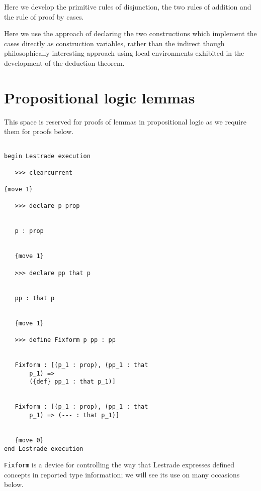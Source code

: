 \documentclass[12pt]{article}
\begin{document}
Here we develop the primitive rules of disjunction, the two rules of addition and the rule of proof by cases.

Here we use the approach of declaring the two constructions which implement the cases directly as construction variables, rather than the indirect though philosophically interesting approach using local environments exhibited in the development of the deduction theorem.

\section{Propositional logic lemmas}

This space is reserved for proofs of lemmas in propositional logic as we require them for proofs below.

\begin{verbatim}

begin Lestrade execution

   >>> clearcurrent

{move 1}

   >>> declare p prop


   p : prop


   {move 1}

   >>> declare pp that p


   pp : that p


   {move 1}

   >>> define Fixform p pp : pp


   Fixform : [(p_1 : prop), (pp_1 : that 
       p_1) => 
       ({def} pp_1 : that p_1)]


   Fixform : [(p_1 : prop), (pp_1 : that 
       p_1) => (--- : that p_1)]


   {move 0}
end Lestrade execution
\end{verbatim}

{\tt Fixform} is a device for controlling the way that Lestrade expresses defined concepts in reported type information; we will see its use on many occasions below.
\end{document}

